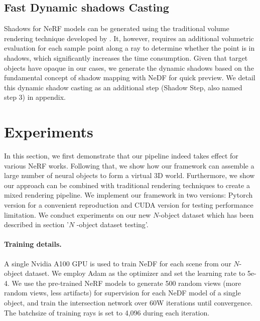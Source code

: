 \documentclass[letterpaper]{article} %
\begin{document}
\subsection{Fast Dynamic shadows Casting}
Shadows for NeRF models can be generated using the traditional volume rendering technique developed by \cite{max1995optical}. It, however, requires an additional volumetric evaluation for each sample point along a ray to determine whether the point is in shadows, which significantly increases the time consumption.
Given that target objects have opaque in our cases, we generate the dynamic shadows based on the fundamental concept of shadow mapping \cite{williams1978casting} with NeDF for quick preview. We detail this dynamic shadow casting as an additional step (Shadow Step, also named step 3) in appendix.

\section{Experiments}
In this section, we first demonstrate that our pipeline indeed takes effect for various NeRF works. Following that, we show how our framework can assemble a large number of neural objects to form a virtual 3D world. Furthermore, we show our approach can be combined with traditional rendering techniques to create a mixed rendering pipeline. We implement our framework in two versions: Pytorch version for a convenient reproduction and CUDA version for testing performance limitation. We conduct experiments on our new $N$-object dataset which has been described in section '$N$ -object dataset testing'.
\paragraph{Training details.}A single Nvidia A100 GPU is used to train NeDF for each scene from our $N$-object dataset. We employ Adam as the optimizer and set the learning rate to 5e-4. We use the pre-trained NeRF models to generate 500 random views (more random views, less artifacts) for supervision for each NeDF model of a single object, and train the intersection network over 60W iterations until convergence. The batchsize of training rays is set to 4,096 during each iteration.
\end{document}
